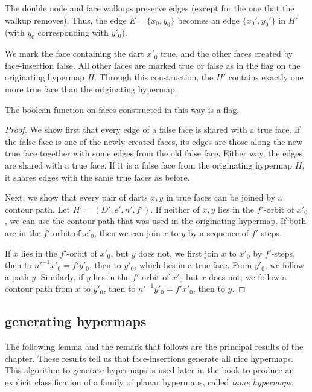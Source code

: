 The double node and face walkups preserve edges (except for
the one that the walkup removes).
Thus, the edge $E=\{x_0,y_0\}$
becomes an edge $\{x_0',y_0'\}$ in $H'$
(with $y_0$ corresponding with $y'_0$).

We mark the face containing the dart $x'_0$ true, and the other
faces created by face-insertion false.   All other faces are
marked true or false as in the flag on the originating hypermap $H$.  
Through this
construction, the $H'$ contains exactly one more true face
than the originating hypermap.

\begin{lemma}\label{lemma:flag} 
The boolean function on faces constructed in this way is a
flag.
\end{lemma}

\begin{proof}  We show first that every edge of a false face is shared
with a true face.  If the false face is one of the newly created
faces, its edges are those along the new true face together
with some edges from the old false
face. Either way, the edges are shared with a true face.   If it is a
false face from the originating hypermap $H$, 
it shares edges with the
same true faces as before.

Next, we show that every pair of darts $x,y$ in true faces can be
joined by a contour path.  Let $H'=(D',e',n',f')$.  
If neither of $x,y$ lies in the
$f'$-orbit of $x'_0$, we can use the contour path that was used in the
originating hypermap.  If both are in the $f'$-orbit of $x'_0$, then
we can join $x$ to $y$ by a sequence of $f'$-steps.

If $x$ lies in the $f'$-orbit of $x'_0$, but $y$ does not, 
we first join $x$
to $x'_0$ by $f'$-steps, then to $n'^{-1} x'_0= f' y'_0$, then to $y'_0$,
which lies in a true face.
From $y'_0$, we follow a path $y$.
Similarly, if $y$ lies in the $f'$-orbit of $x'_0$ but $x$ does not; 
we follow a contour path from $x$ to $y'_0$, then to $n'^{-1} y'_0 = f'
x'_0$, then to $y$.
\end{proof}

\subsection{generating hypermaps}

The following lemma
and the remark that follows are the principal results of the
chapter.  These results tell us that 
face-insertions generate all nice hypermaps.
This algorithm to generate hypermaps is used later in the
book to produce an explicit classification of a family of
planar hypermaps, called {\it tame hypermaps}.

